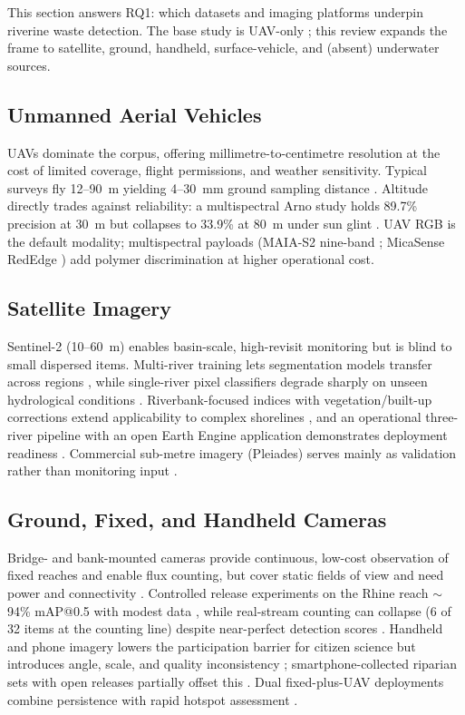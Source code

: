 \documentclass[12pt]{article}
\begin{document}
This section answers RQ1: which datasets and imaging platforms underpin riverine waste detection. The base study is UAV-only \cite{Pati2025}; this review expands the frame to satellite, ground, handheld, surface-vehicle, and (absent) underwater sources.

\subsection{Unmanned Aerial Vehicles}
UAVs dominate the corpus, offering millimetre-to-centimetre resolution at the cost of limited coverage, flight permissions, and weather sensitivity. Typical surveys fly 12--90~m yielding 4--30~mm ground sampling distance \cite{Jakovljevic2020,Maharjan2022,Pati2025}. Altitude directly trades against reliability: a multispectral Arno study holds 89.7\% precision at 30~m but collapses to 33.9\% at 80~m under sun glint \cite{Cortesi2022}. UAV RGB is the default modality; multispectral payloads (MAIA-S2 nine-band \cite{Cortesi2022}; MicaSense RedEdge \cite{Iordache2022}) add polymer discrimination at higher operational cost.

\subsection{Satellite Imagery}
Sentinel-2 (10--60~m) enables basin-scale, high-revisit monitoring but is blind to small dispersed items. Multi-river training lets segmentation models transfer across regions \cite{SoleGomez2022}, while single-river pixel classifiers degrade sharply on unseen hydrological conditions \cite{Mohsen2023}. Riverbank-focused indices with vegetation/built-up corrections extend applicability to complex shorelines \cite{Sakti2023}, and an operational three-river pipeline with an open Earth Engine application demonstrates deployment readiness \cite{PerezGarcia2025}. Commercial sub-metre imagery (Pleiades) serves mainly as validation rather than monitoring input \cite{Sakti2023}.

\subsection{Ground, Fixed, and Handheld Cameras}
Bridge- and bank-mounted cameras provide continuous, low-cost observation of fixed reaches and enable flux counting, but cover static fields of view and need power and connectivity \cite{Lieshout2020,Reinhardt2024}. Controlled release experiments on the Rhine reach $\sim$94\% mAP@0.5 with modest data \cite{Reinhardt2024}, while real-stream counting can collapse (6 of 32 items at the counting line) despite near-perfect detection scores \cite{Lee2025}. Handheld and phone imagery lowers the participation barrier for citizen science but introduces angle, scale, and quality inconsistency \cite{JiaFrontiers2023,Tharani2021}; smartphone-collected riparian sets with open releases partially offset this \cite{Pan2024}. Dual fixed-plus-UAV deployments combine persistence with rapid hotspot assessment \cite{FrontEnv2025}.
\end{document}
